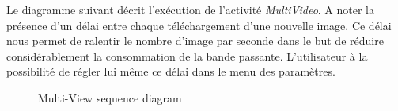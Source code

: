 Le diagramme suivant décrit l'exécution de l'activité \textit{MultiVideo}. A
noter la présence d'un délai entre chaque téléchargement d'une nouvelle image.
Ce délai nous permet de ralentir le nombre d'image par seconde dans le but de réduire considérablement la consommation de la bande passante.
L'utilisateur à la possibilité de régler lui même ce délai dans le menu des
paramètres.
 \begin{figure}[H]
  \label{DiagrammeSequenceMultiView}
  \centering
  \caption{Multi-View sequence diagram}
\end{figure}  


